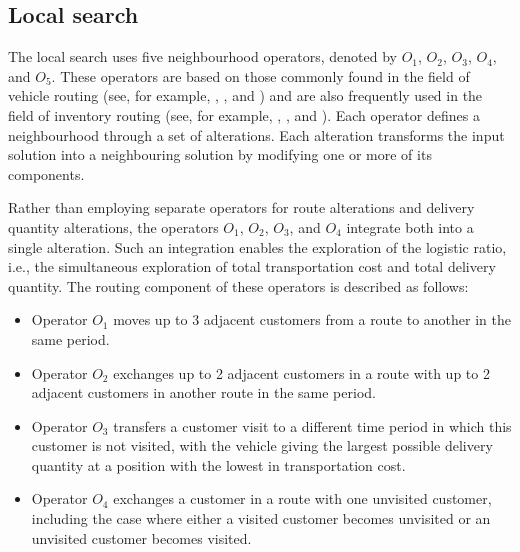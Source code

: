 \documentclass{article}
\begin{document}
\subsection{Local search} \label{sec:local search}


The local search uses five neighbourhood operators, denoted by $O_1$, $O_2$, $O_3$, $O_4$, and $O_5$.  These operators are based on those commonly found in the field of vehicle routing (see, for example, \cite{kindervater1997}, \cite{laporte2000classical}, and \cite{elshaer2020taxonomic}) and are also frequently used in the field of inventory routing (see, for example, \cite{alvarez2018iterated}, \cite{lagana2024iterated}, and \cite{castro2026hybrid}). Each operator defines a neighbourhood through a set of alterations. Each alteration transforms the input solution into a neighbouring solution by modifying one or more of its components.  

Rather than employing separate operators for route alterations and delivery quantity alterations, the operators $O_1$, $O_2$, $O_3$, and $O_4$ integrate both into a single alteration. Such an integration enables the exploration of the logistic ratio, i.e., the simultaneous exploration of total transportation cost and total delivery quantity. The routing component of these operators is described as follows:


\begin{itemize}
\item Operator $O_1$ moves up to 3 adjacent customers from a route to another in the same period. 
\item Operator $O_2$ exchanges up to 2 adjacent customers in a route with up to 2 adjacent customers in another route in the same period.
\item Operator $O_3$ transfers a customer visit to a different time period in which this customer is not visited, with the vehicle giving the largest possible delivery quantity at a position with the lowest in transportation cost.
\item Operator $O_4$ exchanges a customer in a route with one unvisited customer, including the case where either a visited customer becomes unvisited or an unvisited customer becomes visited.
\end{itemize}

\end{document}
